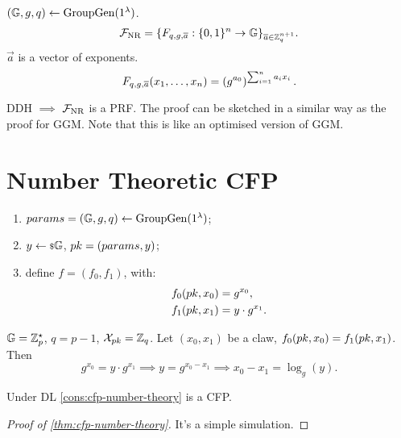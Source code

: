 \begin{construction}
	$\GroupGen$.
	\begin{equation*}
		\F_{\text{NR}} = \{ F_{q,g,\vec{a}} : \{0,1\}^{n} \to \Group \}_{\vec{a} \in \Integers_q^{n+1}}.
	\end{equation*}
	$\vec{a}$ is a vector of exponents.
	\begin{equation*}
		F_{q,g,\vec{a}}(x_1, \dots, x_n) = \left( g^{a_0} \right)^{\sum_{i=1}^{n} a_i x_i}. \qedhere
	\end{equation*}
\end{construction}
\ac{DDH} $\implies$ $\F_{\text{NR}}$ is a \ac{PRF}.
The proof can be sketched in a similar way as the proof for \ac{GGM}.
Note that this is like an optimised version of \ac{GGM}.

\section{Number Theoretic \acl{CFP}}

\begin{construction} \label{cons:cfp-number-theory}
	\begin{enumerate}
		\item $\params = \GroupGen$;
		\item $y \rand{\Group}$, $\pk = (\params, y)$;
		\item define $f = (f_0, f_1)$, with:
			\begin{align*}
				f_0(\pk, x_0) & = g^{x_0}, \\
				f_1(\pk, x_1) & = y \cdot g^{x_1}.
			\end{align*}
	\end{enumerate}
\end{construction}
$\Group = \Integers_p^{\star}$, $q = p-1$, $\X_{\pk} = \Integers_q$.
Let $(x_0, x_1)$ be a claw, \ie $f_0(\pk, x_0) = f_1(\pk, x_1)$.
Then
\begin{equation*}
	g^{x_0} = y \cdot g^{x_1} \implies y = g^{x_0 - x_1} \implies x_0 - x_1 = \log_g(y).
\end{equation*}

\begin{theorem} \label{thm:cfp-number-theory}
	Under \ac{DL} \cref{cons:cfp-number-theory} is a \ac{CFP}.
\end{theorem}

\begin{proof}[Proof of \cref{thm:cfp-number-theory}]
	It's a simple simulation.
\end{proof}

